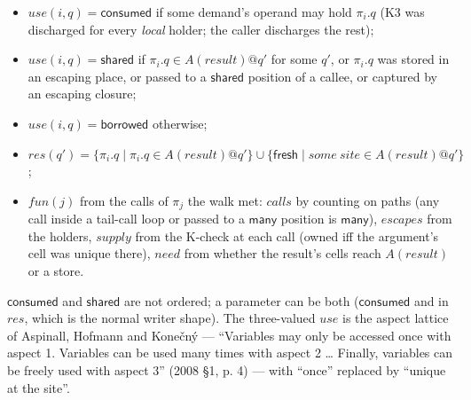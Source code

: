 \begin{itemize}
\item $\mathit{use}(i,\allowbreak{}q)=\mathsf{consumed}$ if some demand's operand may hold $\pi _{i}.q$ (K3 was discharged for every \emph{local} holder; the caller discharges the rest);
\item $\mathit{use}(i,\allowbreak{}q)=\mathsf{shared}$ if $\pi _{i}.q \in A(\mathit{result})@q'$ for some $q'$, or $\pi _{i}.q$ was stored in an escaping place, or passed to a $\mathsf{shared}$ position of a callee, or captured by an escaping closure;
\item $\mathit{use}(i,\allowbreak{}q)=\mathsf{borrowed}$ otherwise;
\item $\mathit{res}(q')=\{\pi _{i}.q\mid \pi _{i}.q\in A(\mathit{result})@q'\}\cup \{\mathsf{fresh}\mid \mathit{some}\ \mathit{site}\in A(\mathit{result})@q'\}$;
\item $\mathit{fun}(j)$ from the calls of $\pi _{j}$ the walk met: $\mathit{calls}$ by counting on paths (any call inside a tail-call loop or passed to a $\mathsf{many}$ position is $\mathsf{many}$), $\mathit{escapes}$ from the holders, $\mathit{supply}$ from the K-check at each call (owned iff the argument's cell was unique there), $\mathit{need}$ from whether the result's cells reach $A(\mathit{result})$ or a store.
\end{itemize}

$\mathsf{consumed}$ and $\mathsf{shared}$ are not ordered; a parameter can be both ($\mathsf{consumed}$ and in $\mathit{res}$, which is the normal writer shape). The three-valued $\mathit{use}$ is the aspect lattice of Aspinall, Hofmann and Konečný — “Variables may only be accessed once with aspect 1. Variables can be used many times with aspect 2 … Finally, variables can be freely used with aspect 3” (2008 §1, p. 4) — with “once” replaced by “unique at the site”.


